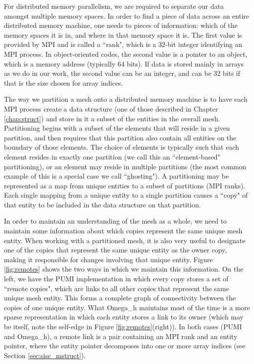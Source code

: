 For distributed memory parallelism, we are required to separate our
data amongst multiple memory spaces.
In order to find a piece of data across an entire distributed memory
machine, one needs to pieces of information: which of the
memory spaces it is in, and where in that memory space it is.
The first value is provided by MPI and is called a ``rank", which is
a 32-bit integer identifying an MPI process.
In object-oriented codes, the second value is a pointer
to an object, which is a memory address (typically 64 bits).
If data is stored mainly in arrays as we do in our work,
the second value can be an integer, and can be 32 bits if
that is the size chosen for array indices.

The way we partition a mesh onto a distributed memory machine is
to have each MPI process create a data structure (one of those
described in Chapter \ref{chap:struct}) and store in it a subset
of the entities in the overall mesh.
Partitioning begins with a subset of the elements that will
reside in a given partition, and then requires that this
partition also contain all entities on the boundary of those
elements.
The choice of elements is typically such that each element resides
in exactly one partition (we call this an ``element-based" partitioning),
or an element may reside in multiple partitions (the most common
example of this is a special case we call ``ghosting").
A partitioning may be represented as a map from unique entities
to a subset of partitions (MPI ranks).
Each single mapping from a unique entity to a single partition
causes a ``copy" of that entity to be included in the data structure
on that partition.

In order to maintain an understanding of the mesh as a whole,
we need to maintain some information about which copies represent
the same unique mesh entity.
When working with a partitioned mesh, it is also very useful to
designate one of the copies that represent the same unique entity
as the owner copy, making it responsible for changes involving
that unique entity.
Figure \ref{fig:remotes} shows the two ways in which we maintain
this information.
On the left, we have the PUMI implementation in which every copy
stores a set of ``remote copies", which are links to all other copies
that represent the same unique mesh entity.
This forms a complete graph of connectivity between the copies of
one unique entity.
What Omega\_h maintains most of the time is a more sparse representation
in which each entity stores a link to its owner (which may
be itself, note the self-edge in Figure \ref{fig:remotes}(right)).
In both cases (PUMI and Omega\_h), a remote link is a pair
containing an MPI rank and an entity pointer, where the
entity pointer decomposes into one or more array indices
(see Section \ref{sec:sisc_mstruct}).

